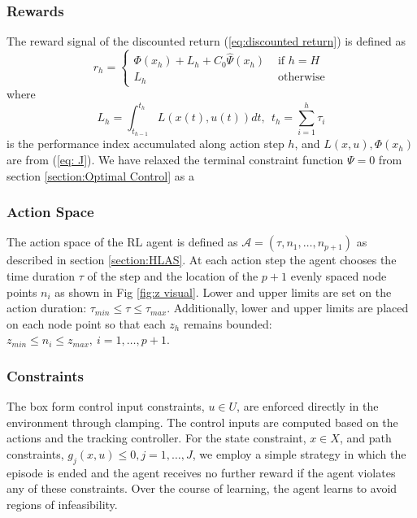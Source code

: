 \documentclass{UnderReview}
\begin{document}
\subsubsection{Rewards}
The reward signal of the discounted return (\ref{eq:discounted return}) is defined as
\begin{equation}\label{eq:HLAS Deep RL reward}
	r_h = 
	\begin{cases}
		\Phi(x_h) + L_h + C_0\hat\Psi(x_h) &\text{ if $h=H$} \\
		L_h &\text{ otherwise}
	\end{cases}	
\end{equation}
where
\begin{equation} \label{eq:HLAS Deep RL reward performance index}
	L_h = \int_{t_{h-1}}^{t_h} L(x(t),u(t))dt,~~t_h=\sum_{i=1}^{h}\tau_i
\end{equation}
is the performance index accumulated along action step $h$, and $L(x,u), \Phi(x_h)$ are from (\ref{eq: J}).  We have relaxed the terminal constraint function $\Psi=0$ from section \ref{section:Optimal Control} as a 
\subsubsection{Action Space}\label{section: ProblemFormulation_actionspace}
The action space of the RL agent is defined as $\mathcal{A}=(\tau, n_{1},\dots,n_{p+1})$ as described in section \ref{section:HLAS}.  At each action step the agent chooses the time duration $\tau$ of the step and the location of the $p+1$ evenly spaced node points $n_i$ as shown in Fig \ref{fig:z visual}.  Lower and upper limits are set on the action duration: $\tau_{min} \leq \tau \leq \tau_{max}$.  Additionally, lower and upper limits are placed on each node point so that each $z_h$ remains bounded:  $z_{min} \leq n_{i} \leq z_{max}, ~i={1,\dots,p+1}$.
\subsubsection{Constraints}
The box form control input constraints, $u\in U$, are enforced directly in the environment through clamping. The control inputs are computed based on the actions and the tracking controller.  For the state constraint, $x\in X$, and path constraints, $g_j(x,u)\leq 0, j=1,\dots,J$, we employ a simple strategy in which the episode is ended and the agent receives no further reward if the agent violates any of these constraints.  Over the course of learning, the agent learns to avoid regions of infeasibility.  
\end{document}
